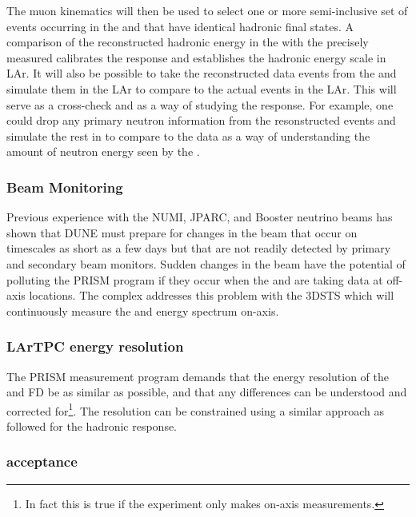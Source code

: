 The muon kinematics will then be used to select one or more semi-inclusive set of events occurring in the \larnd and  that have identical hadronic final states. A comparison of the reconstructed hadronic energy in the \larnd with the precisely measured  calibrates the response and establishes the hadronic energy scale in LAr. It will also be possible to take the reconstructed data events from the  and simulate them in the LAr to compare to the actual events in the LAr. This will serve as a cross-check and as a way of studying the response. For example, one could drop any primary neutron information from the  resonstructed events and simulate the rest in \larnd to compare to the \larnd data as a way of understanding the amount of neutron energy seen by the \larnd.

\subsubsection{Beam Monitoring}
Previous experience with the NUMI, JPARC, and Booster neutrino beams has shown that DUNE must prepare for changes in the beam that occur on timescales as short as a few days but that are not readily detected by primary and secondary beam monitors. Sudden changes in the beam have the potential of polluting the PRISM program if they occur when the \larnd and  are taking data at off-axis locations. The   complex addresses this problem with the 3DSTS which will continuously measure the \numu and \anumu energy spectrum on-axis.


\subsubsection{LArTPC energy resolution}

The PRISM measurement program demands that the energy resolution of the \larnd and FD be as similar as possible, and that any differences can be understood and corrected for\footnote{In fact this is true if the experiment only makes on-axis measurements.}. The resolution can be constrained using a similar approach as followed for the hadronic response. 


\subsubsection{\larnd acceptance}

